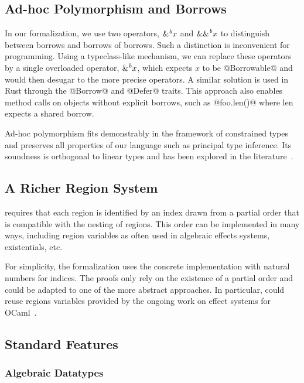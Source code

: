 \subsection{Ad-hoc Polymorphism and Borrows}

In our formalization, we use two operators, ${\&}^{\textit{b}}x$ and ${\&\&}^{\textit{b}}x$ to
distinguish between borrows and borrows of borrows.
Such a distinction is inconvenient for programming.
Using a typeclass-like mechanism, we can replace these operators
by a single overloaded operator, ${\&}^{\textit{b}}x$, which expects $x$ to be @Borrowable@ and
would then desugar to the more precise operators.
A similar solution is used in Rust through the @Borrow@ and @Defer@
traits.
This approach also enables method calls on objects without
explicit borrows, such as @foo.len()@ where len expects a shared borrow.

Ad-hoc polymorphism fits demonstrably in the \hmx framework of constrained
types and preserves all properties of our language such
as principal type inference. Its soundness is orthogonal to linear types
and has been explored in the literature~\citep{DBLP:conf/fpca/OderskyWW95}.

\subsection{A Richer Region System}

\lang requires that each region is identified by an index drawn from a partial
order that is compatible with the nesting of regions.
This order can be implemented in many ways, including region variables
as often used in algebraic effects systems, existentials, etc.

For simplicity, the formalization uses the concrete implementation with 
natural numbers for indices. The proofs only rely on
the existence of a partial order and could be adapted to one of the
more abstract approaches.
In particular, \lang could reuse regions variables provided by
the ongoing work on effect systems
for OCaml~\cite{DBLP:conf/sfp/DolanEHMSW17}.

\subsection{Standard Features}

\subsubsection{Algebraic Datatypes}

